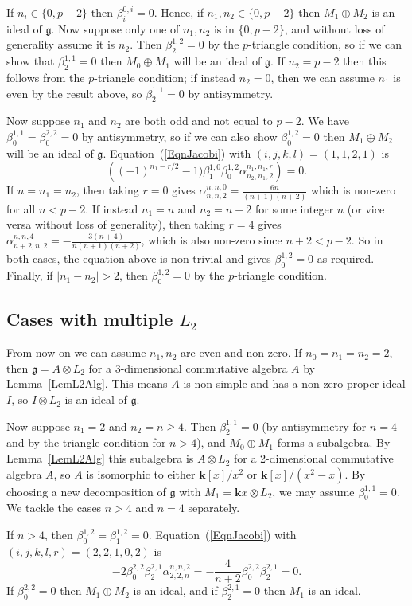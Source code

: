 \documentclass[11pt,a4paper,reqno]{amsart}
\theoremstyle{definition}
\newcommand{\bk}{\mathbf{k}}
\numberwithin{equation}{section}
\newcommand{\fg}{\mathfrak{g}}
\begin{document}
If $n_i\in\{0,p-2\}$ then $\beta^{0,i}_i=0$. Hence, if $n_1,n_2\in\{0,p-2\}$ then $M_1\oplus M_2$ is an ideal of $\fg$. Now suppose only one of $n_1,n_2$ is in $\{0,p-2\}$, and without loss of generality assume it is $n_2$. Then $\beta^{1,2}_2=0$ by the $p$-triangle condition, so if we can show that $\beta^{1,1}_2=0$ then $M_0\oplus M_1$ will be an ideal of $\fg$. If $n_2=p-2$ then this follows from the $p$-triangle condition; if instead $n_2=0$, then we can assume $n_1$ is even by the result above, so $\beta^{1,1}_2=0$ by antisymmetry.

Now suppose $n_1$ and $n_2$ are both odd and not equal to $p-2$. We have $\beta^{1,1}_0=\beta^{2,2}_0=0$ by antisymmetry, so if we can also show $\beta^{1,2}_0=0$ then $M_1\oplus M_2$ will be an ideal of $\fg$. Equation~(\ref{EqnJacobi}) with $(i,j,k,l)=(1,1,2,1)$ is
\[\left((-1)^{n_1-r/2}-1)\beta^{1,0}_1\beta^{1,2}_0\alpha^{n_1,n_1,r}_{n_2,n_1,2}\right)=0.\]
If $n=n_1=n_2$, then taking $r=0$ gives $\alpha^{n,n,0}_{n,n,2}=\frac{6n}{(n+1)(n+2)}$ which is non-zero for all $n<p-2$. If instead $n_1=n$ and $n_2=n+2$ for some integer $n$ (or vice versa without loss of generality), then taking $r=4$ gives $\alpha^{n,n,4}_{n+2,n,2}=-\frac{3(n+4)}{n(n+1)(n+2)}$, which is also non-zero since $n+2<p-2$. So in both cases, the equation above is non-trivial and gives $\beta^{1,2}_0=0$ as required. Finally, if $|n_1-n_2|>2$, then $\beta^{1,2}_0=0$ by the $p$-triangle condition.

\subsection{Cases with multiple $L_2$}\label{SecMultipleL2} From now on we can assume $n_1,n_2$ are even and non-zero. If $n_0=n_1=n_2=2$, then $\fg=A\otimes L_2$ for a 3-dimensional commutative algebra $A$ by Lemma~\ref{LemL2Alg}. This means $A$ is non-simple and has a non-zero proper ideal $I$, so $I\otimes L_2$ is an ideal of $\fg$.

Now suppose $n_1=2$ and $n_2=n\geq4$. Then $\beta^{1,1}_2=0$ (by antisymmetry for $n=4$ and by the triangle condition for $n>4$), and $M_0\oplus M_1$ forms a subalgebra. By Lemma~\ref{LemL2Alg} this subalgebra is $A\otimes L_2$ for a 2-dimensional commutative algebra $A$, so $A$ is isomorphic to either $\bk[x]/x^2$ or $\bk[x]/(x^2-x)$. By choosing a new decomposition of $\fg$ with $M_1=\bk x\otimes L_2$, we may assume $\beta^{1,1}_0=0$. We tackle the cases $n>4$ and $n=4$ separately.

If $n>4$, then $\beta^{1,2}_0=\beta^{1,2}_1=0$. Equation~(\ref{EqnJacobi}) with $(i,j,k,l,r)=(2,2,1,0,2)$ is
\[-2\beta^{2,2}_0\beta^{2,1}_2\alpha^{n,n,2}_{2,2,n}=-\frac{4}{n+2}\beta^{2,2}_0\beta^{2,1}_2=0.\]
If $\beta^{2,2}_0=0$ then $M_1\oplus M_2$ is an ideal, and if $\beta^{2,1}_2=0$ then $M_1$ is an ideal.
\end{document}
